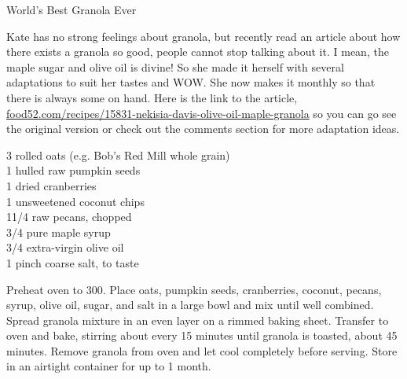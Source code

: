 \begin{entry}{World's Best Granola Ever}

\begin{open}
  Kate has no strong feelings about granola, but recently read an article
  about how there exists a granola so good, people cannot stop talking about
  it. I mean, the maple sugar and olive oil is divine! So she made it herself
  with several adaptations to suit her tastes and WOW. She now makes it
  monthly so that there is always some on hand. Here is the link to the
  article,
  \url{food52.com/recipes/15831-nekisia-davis-olive-oil-maple-granola} so you
  can go see the original version or check out the comments section for more
  adaptation ideas.
\end{open}
\begin{ingredients}
    \SI{3}{\cup} rolled oats (e.g. Bob's Red Mill whole grain)\\
    \SI{1}{\cup} hulled raw pumpkin seeds\\
    \SI{1}{\cup} dried cranberries\\
    \SI{1}{\cup} unsweetened coconut chips\\
    1\SI{1/4}{\cup} raw pecans, chopped\\
    \SI{3/4}{\cup} pure maple syrup\\
    \SI{3/4}{\cup} extra-virgin olive oil\\
    1 pinch coarse salt, to taste
\end{ingredients}
Preheat oven to \SI{300}{\degreeF}. Place oats, pumpkin seeds, cranberries,
coconut, pecans, syrup, olive oil, sugar, and salt in a large bowl and mix
until well combined. Spread granola mixture in an even layer on a rimmed
baking sheet. Transfer to oven and bake, stirring about every 15 minutes until
granola is toasted, about 45 minutes. Remove granola from oven and let cool
completely before serving. Store in an airtight container for up to 1 month.
\end{entry}
